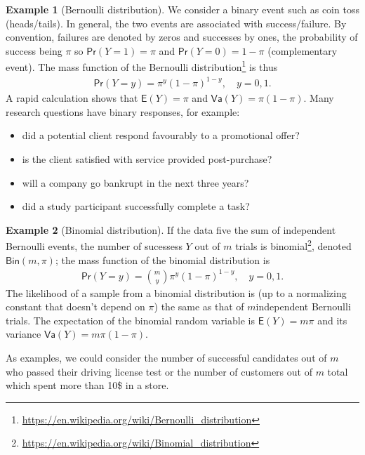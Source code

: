 \documentclass[
  11pt,
  letterpaper,
]{book}
\providecommand{\tightlist}{%
  \setlength{\itemsep}{0pt}\setlength{\parskip}{0pt}}
\renewcommand{\href}[2]{#2\footnote{\url{#1}}}
\theoremstyle{definition}
\theoremstyle{definition}
\newtheorem{example}{Example}[chapter]
\theoremstyle{definition}
\theoremstyle{remark}
\begin{document}
\begin{example}[Bernoulli distribution]
\protect\hypertarget{exm:bernoullidist}{}{\label{exm:bernoullidist} {} }We consider a binary event such as coin toss (heads/tails). In general, the two events are associated with success/failure. By convention, failures are denoted by zeros and successes by ones, the probability of success being \(\pi\) so \(\mathsf{Pr}(Y=1)=\pi\) and \(\mathsf{Pr}(Y=0)=1-\pi\) (complementary event). The mass function of the \href{https://en.wikipedia.org/wiki/Bernoulli_distribution}{Bernoulli distribution} is thus
\begin{align*}
\mathsf{Pr}(Y=y) = \pi^y (1-\pi)^{1-y}, \quad y=0, 1.
\end{align*}
A rapid calculation shows that \(\mathsf{E}(Y)=\pi\) and \(\mathsf{Va}(Y)=\pi(1-\pi)\).
Many research questions have binary responses, for example:

\begin{itemize}
\tightlist
\item
  did a potential client respond favourably to a promotional offer?
\item
  is the client satisfied with service provided post-purchase?
\item
  will a company go bankrupt in the next three years?
\item
  did a study participant successfully complete a task?
\end{itemize}
\end{example}

\begin{example}[Binomial distribution]
\protect\hypertarget{exm:binomialdist}{}{\label{exm:binomialdist} {} }If the data five the sum of independent Bernoulli events, the number of sucessess \(Y\) out of \(m\) trials is \href{https://en.wikipedia.org/wiki/Binomial_distribution}{binomial}, denoted \(\mathsf{Bin}(m, \pi)\); the mass function of the binomial distribution is
\begin{align*}
\mathsf{Pr}(Y=y) = \binom{m}{y}\pi^y (1-\pi)^{1-y}, \quad y=0, 1.
\end{align*}
The likelihood of a sample from a binomial distribution is (up to a normalizing constant that doesn't depend on \(\pi\)) the same as that of \(m\)independent Bernoulli trials. The expectation of the binomial random variable is \(\mathsf{E}(Y)=m\pi\) and its variance \(\mathsf{Va}(Y)=m\pi(1-\pi)\).

As examples, we could consider the number of successful candidates out of \(m\) who passed their driving license test or the number of customers out of \(m\) total which spent more than 10\$ in a store.
\end{example}
\end{document}
